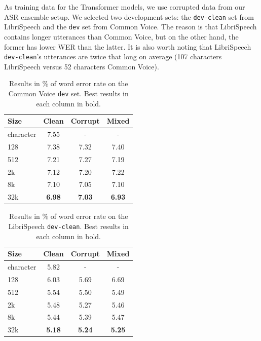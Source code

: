 As training data for the Transformer models, we use corrupted data from our ASR ensemble setup. We selected two development sets: the \texttt{dev-clean} set from LibriSpeech and the \texttt{dev} set from Common Voice. The reason is that LibriSpeech contains longer utterances than Common Voice, but on the other hand, the former has lower WER than the latter. It is also worth noting that LibriSpeech \texttt{dev-clean}'s utterances are twice that long on average (107 characters LibriSpeech versus 52 characters Common Voice).

\begin{table}[p]
	\centering
	\begin{tabular}{l|ccc}
		\bf Size & \bf Clean & \bf Corrupt & \bf Mixed \\
		\hline
		character &  7.55  &  -  &  -  \\
		128 & 7.38   &  7.32  & 7.40  \\
		512 &  7.21  & 7.27   & 7.19  \\
		2k & 7.12   & 7.20 & 7.22  \\
		8k &  7.10  & 7.05  & 7.10  \\
		32k &  \textbf{6.98}  & \textbf{7.03}  &  \textbf{6.93} \\
		
	\end{tabular}
	\caption[Results on the Common Voice \texttt{dev} set]{Results in \% of word error rate on the Common Voice \texttt{dev} set. Best results in each column in bold.}
	\label{tab:results_vocabularies_common}
\end{table}

\begin{table}[p]
	\centering
	\begin{tabular}{l|ccc}
		\bf Size & \bf Clean & \bf Corrupt & \bf Mixed \\
		\hline
		character &  5.82  &  -  &  -  \\
		128 &  6.03  &  5.69  &  6.69  \\
		512 &    5.54  &  5.50   &  5.49 \\
		2k &  5.48  & 5.27  & 5.46  \\
		8k &  5.44  &   5.39 & 5.47  \\
		32k &  \textbf{5.18}  & \textbf{5.24}  &  \textbf{5.25} \\
		
	\end{tabular}
	\caption[Results on the LibriSpeech]{Results in \% of word error rate on the LibriSpeech \texttt{dev-clean}. Best results in each column in bold.}
	\label{tab:results_vocabularies_libri}
\end{table}

